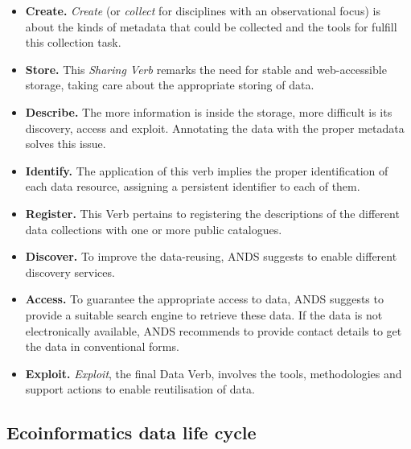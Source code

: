 \begin{itemize}
    \item \textbf{Create.} \textit{Create} (or \textit{collect} for disciplines with an observational focus) is about the kinds of metadata that could be collected and the tools for fulfill this collection task.
    \item \textbf{Store.} This \textit{Sharing Verb} remarks the need for stable and web-accessible storage, taking care about the appropriate storing of data.
    \item \textbf{Describe.} The more information is inside the storage, more difficult is its discovery, access and exploit. Annotating the data with the proper metadata solves this issue.
    \item \textbf{Identify.} The application of this verb implies the proper identification of each data resource, assigning a persistent identifier to each of them.
    \item \textbf{Register.} This Verb pertains to registering the descriptions of the different data collections with one or more public catalogues.
    \item \textbf{Discover.} To improve the data-reusing, ANDS suggests to enable different discovery services.
    \item \textbf{Access.} To guarantee the appropriate access to data, ANDS suggests to provide a suitable search engine to retrieve these data. If the data is not electronically available, ANDS recommends to provide contact details to get the data in conventional forms.
    \item \textbf{Exploit.} \textit{Exploit}, the final Data Verb, involves the tools, methodologies and support actions to enable reutilisation of data.
\end{itemize}

\subsection{Ecoinformatics data life cycle}

